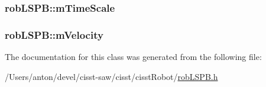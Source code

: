 \subsubsection[{m\+Time\+Scale}]{ rob\+L\+S\+P\+B\+::m\+Time\+Scale\hspace{0.3cm}{\ttfamily [protected]}}\label{classrob_l_s_p_b_aa239e468d4cd7628eda3dd9a799c1742}
\hypertarget{classrob_l_s_p_b_a57058d6e24b9b68cd3b2327c5c523eb4}{}
\subsubsection[{m\+Velocity}]{ rob\+L\+S\+P\+B\+::m\+Velocity\hspace{0.3cm}{\ttfamily [protected]}}\label{classrob_l_s_p_b_a57058d6e24b9b68cd3b2327c5c523eb4}


The documentation for this class was generated from the following file\+:\begin{DoxyCompactItemize}
\item 
/\+Users/anton/devel/cisst-\/saw/cisst/cisst\+Robot/\hyperlink{rob_l_s_p_b_8h}{rob\+L\+S\+P\+B.\+h}\end{DoxyCompactItemize}

